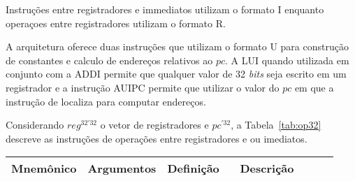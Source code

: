   Instruções entre registradores e immediatos utilizam o formato I enquanto operaçoes entre registradores 
  utilizam o formato R.
  
  A arquitetura oferece duas instruções que utilizam o formato U para construção de constantes e
  calculo de endereços relativos ao $pc$. A LUI quando utilizada em conjunto com a ADDI permite que
  qualquer valor de 32 \emph{bits} seja escrito em um registrador e a instrução AUIPC permite que
  utilizar o valor do $pc$ em que a instrução de localiza para computar endereços.

  Considerando $reg^{32'32}$ o vetor de registradores e $pc^{'32}$, a
  Tabela~\ref{tab:op32} descreve as instruções de operações entre registradores e ou imediatos.

  \begin{table}
    \begin{tabular}{ |p{0.13\linewidth}||p{0.15\linewidth}|p{0.25\linewidth}|p{0.40\linewidth}| } 
      \hline
      Mnemônico & Argumentos & Definição & Descrição\\ \hline \hline


\end{tabular}
\end{table}
